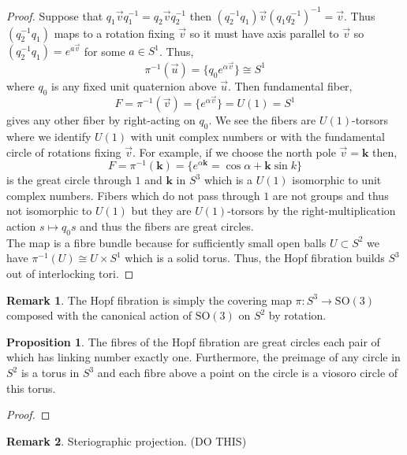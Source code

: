 \documentclass[12pt]{extarticle}
\theoremstyle{definition}
\newtheorem{proposition}[theorem]{Proposition}
\newtheorem{remark}{Remark}
\renewcommand{\bf}[1]{\mathbf{#1}}
\newcommand{\SO}[1]{\mathrm{SO}\left(#1\right)}
\newcommand{\rd}[1]{{ \color{red} #1 }}
\begin{document}
\begin{proof}
Suppose that $q_1 \vec{v} q_1^{-1} = q_2 \vec{v} q_2^{-1}$ then $(q_2^{-1} q_1) \vec{v} (q_1 q_2^{-1})^{-1} = \vec{v}$. Thus $(q_2^{-1} q_1)$ maps to a rotation fixing $\vec{v}$ so it must have axis parallel to $\vec{v}$ so $(q_2^{-1} q_1) = e^{a \vec{v}}$ for some $a \in S^1$. Thus,
\[ \pi^{-1}(\vec{u}) = \{ q_0 e^{\alpha \vec{v}} \} \cong S^1 \]
where $q_0$ is any fixed unit quaternion above $\vec{u}$. Then fundamental fiber,
\[F = \pi^{-1}(\vec{v}) = \{ e^{\alpha \vec{v}} \} = U(1) = S^1 \]
gives any other fiber by right-acting on $q_0$. We see the fibers are $U(1)$-torsors where we identify $U(1)$ with unit complex numbers or with the fundamental circle of rotations fixing $\vec{v}$. For example, if we choose the north pole $\vec{v} = \bf{k}$ then,
\[ F = \pi^{-1}(\bf{k}) = \{ e^{\alpha \bf{k}} = \cos{\alpha} + \bf{k} \sin{k} \} \]
is the great circle through $1$ and $\bf{k}$ in $S^3$ which is a $U(1)$ isomorphic to unit complex numbers. Fibers which do not pass through $1$ are not groups and thus not isomorphic to $U(1)$ but they are $U(1)$-torsors by the right-multiplication action $s \mapsto q_0 s$ and thus the fibers are great circles.
\bigskip\\
The map is a fibre bundle because for sufficiently small open balls $U \subset S^2$ we have $\pi^{-1}(U) \cong U \times S^1$ which is a solid torus. Thus, the Hopf fibration builds $S^3$ out of interlocking tori.
\end{proof}

\begin{remark}
The Hopf fibration is simply the covering map $\pi : S^3 \to \SO{3}$ composed with the canonical action of $\SO{3}$ on $S^2$ by rotation. 
\end{remark}

\rd{

\begin{proposition}
The fibres of the Hopf fibration are great circles each pair of which has linking number exactly one. Furthermore, the preimage of any circle in $S^2$ is a torus in $S^3$ and each fibre above a point on the circle is a viosoro circle of this torus.
\end{proposition}

\begin{proof}

\end{proof}

\begin{remark}
Steriographic projection. \rd{(DO THIS)}
\end{remark}

}
\end{document}
